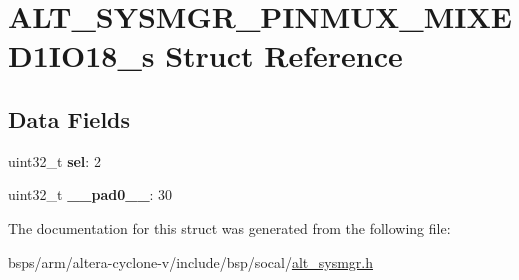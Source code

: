 \hypertarget{structALT__SYSMGR__PINMUX__MIXED1IO18__s}{}\section{A\+L\+T\+\_\+\+S\+Y\+S\+M\+G\+R\+\_\+\+P\+I\+N\+M\+U\+X\+\_\+\+M\+I\+X\+E\+D1\+I\+O18\+\_\+s Struct Reference}
\label{structALT__SYSMGR__PINMUX__MIXED1IO18__s}
\subsection*{Data Fields}
\begin{DoxyCompactItemize}
\item 
\mbox{\label{structALT__SYSMGR__PINMUX__MIXED1IO18__s_a87e4da10e4be226975f7956863745ad8}} 
uint32\+\_\+t {\bfseries sel}\+: 2
\item 
\mbox{\label{structALT__SYSMGR__PINMUX__MIXED1IO18__s_ab8e864a73c539ea83eb3bee04e4d5475}} 
uint32\+\_\+t {\bfseries \+\_\+\+\_\+pad0\+\_\+\+\_\+}\+: 30
\end{DoxyCompactItemize}


The documentation for this struct was generated from the following file\+:\begin{DoxyCompactItemize}
\item 
bsps/arm/altera-\/cyclone-\/v/include/bsp/socal/\mbox{\hyperlink{alt__sysmgr_8h}{alt\+\_\+sysmgr.\+h}}\end{DoxyCompactItemize}

